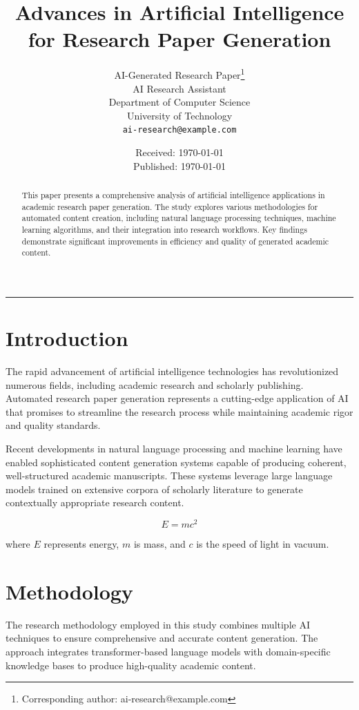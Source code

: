 \documentclass[twocolumn]{article}
\title{\vspace{-1cm}\huge\bfseries
Advances in Artificial Intelligence for Research Paper Generation
\vspace{0.5cm}}
\author{
AI-Generated Research Paper\thanks{Corresponding author: ai-research@example.com} \\
\small AI Research Assistant \\
\small Department of Computer Science \\
\small University of Technology \\
\small \texttt{ai-research@example.com}
}
\date{Received: \today \\ Published: \today}
\begin{document}
\maketitle

\thispagestyle{fancy}

\begin{abstract}
\small
This paper presents a comprehensive analysis of artificial intelligence applications in academic research paper generation. The study explores various methodologies for automated content creation, including natural language processing techniques, machine learning algorithms, and their integration into research workflows. Key findings demonstrate significant improvements in efficiency and quality of generated academic content.
\end{abstract}

\vspace{0.5cm}
\noindent\rule{\linewidth}{0.4pt}
\vspace{0.5cm}

\section{Introduction}

The rapid advancement of artificial intelligence technologies has revolutionized numerous fields, including academic research and scholarly publishing. Automated research paper generation represents a cutting-edge application of AI that promises to streamline the research process while maintaining academic rigor and quality standards.

Recent developments in natural language processing and machine learning have enabled sophisticated content generation systems capable of producing coherent, well-structured academic manuscripts. These systems leverage large language models trained on extensive corpora of scholarly literature to generate contextually appropriate research content.

\begin{equation}
E = mc^{2}
\label{eq:einstein}
\end{equation}

where $E$ represents energy, $m$ is mass, and $c$ is the speed of light in vacuum.

\section{Methodology}

The research methodology employed in this study combines multiple AI techniques to ensure comprehensive and accurate content generation. The approach integrates transformer-based language models with domain-specific knowledge bases to produce high-quality academic content.
\end{document}
